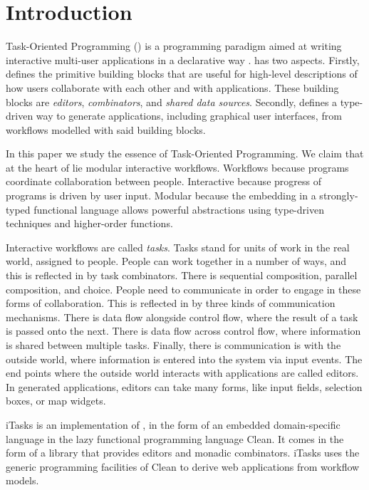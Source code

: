 


\section{Introduction}

Task-Oriented Programming (\TOP) is a programming paradigm aimed at writing interactive multi-user applications in a declarative way \cite{conf/ppdp/PlasmeijerLMAK12}.
\TOP has two aspects.
Firstly, \TOP defines the primitive building blocks that are useful for high-level descriptions of how users collaborate with each other and with applications.
These building blocks are \emph{editors}, \emph{combinators}, and \emph{shared data sources}.
Secondly, \TOP defines a type-driven way to generate applications, including graphical user interfaces, from workflows modelled with said building blocks.

In this paper we study the essence of Task-Oriented Programming.
We claim that at the heart of \TOP lie modular interactive workflows.
Workflows because \TOP programs coordinate collaboration between people.
Interactive because progress of \TOP programs is driven by user input.
Modular because the embedding in a strongly-typed functional language allows powerful abstractions using type-driven techniques and higher-order functions.

Interactive workflows are called \emph{tasks}.
Tasks stand for units of work in the real world, assigned to people.
People can work together in a number of ways, and this is reflected in \TOP by task combinators.
There is sequential composition, parallel composition, and choice.
People need to communicate in order to engage in these forms of collaboration.
This is reflected in \TOP by three kinds of communication mechanisms.
There is data flow alongside control flow, where the result of a task is passed onto the next.
There is data flow across control flow, where information is shared between multiple tasks.
Finally, there is communication is with the outside world, where information is entered into the system via input events.
The end points where the outside world interacts with applications are called editors.
In generated applications, editors can take many forms, like input fields, selection boxes, or map widgets.

iTasks is an implementation of \TOP, in the form of an embedded domain-specific language in the lazy functional programming language Clean.
It comes in the form of a library that provides editors and monadic combinators.
iTasks uses the generic programming facilities of Clean to derive web applications from workflow models.

